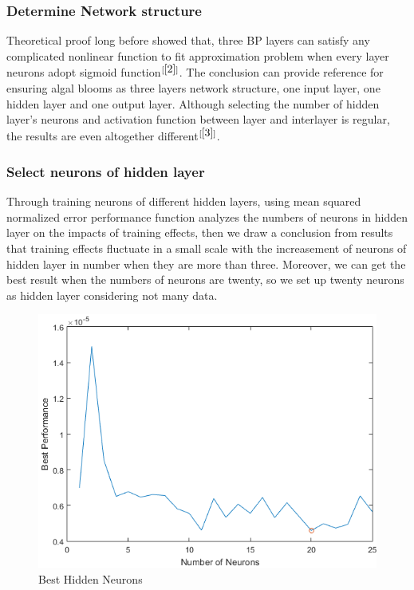 \documentclass[12pt,a4paper]{article}
\begin{document}
\subsubsection{Determine Network structure}
Theoretical proof long before showed that, three BP layers can satisfy any complicated nonlinear function to fit approximation problem when every layer neurons adopt sigmoid function$^{[\ref{2}]}$. The conclusion can provide reference for ensuring algal blooms as three layers network structure, one input layer, one hidden layer and one output layer. Although selecting the number of hidden layer's neurons and activation function between layer and interlayer is regular, the results are even altogether different$^{[\ref{3}]}$.\par  

\subsubsection{Select neurons of hidden layer}
Through training neurons of different hidden layers, using mean squared normalized error performance function analyzes the numbers of neurons in hidden layer on the impacts of training effects, then we draw a conclusion from results that training effects fluctuate in a small scale with the increasement of neurons of hidden layer in number when they are more than three. Moreover, we can get the best result when the numbers of neurons are twenty, so we set up twenty neurons as hidden layer considering not many data.\par

\begin{figure}[H]
\centering
\includegraphics[width=0.7\linewidth]{figure/BestHiddenNeurons}
\caption{Best Hidden Neurons}
\end{figure}\par
\end{document}
